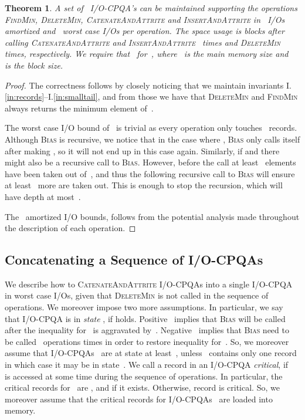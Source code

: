 \documentclass[]{article}
\newcommand{\iref}[1]{I.\ref{#1}}
\newtheorem{theorem}{Theorem}[section]
\begin{document}
\begin{theorem} \label{thm:iocpqa}
  A set of~ I/O-CPQA's can be maintained supporting the operations
  \textsc{FindMin}, \textsc{DeleteMin}, \textsc{CatenateAndAttrite} and
  \textsc{InsertAndAttrite} in~ I/Os amortized and~ worst
  case I/Os per operation. The space usage is  blocks
  after calling \textsc{CatenateAndAttrite} and \textsc{InsertAndAttrite}~
  times and \textsc{DeleteMin}~ times, respectively. We require that~ for~, where~ is the main memory size and~ is
  the block size.
\end{theorem}
\begin{proof}
  The correctness follows by closely noticing that we maintain invariants
  \iref{in:records}--\iref{in:smalltail}, and from those we have that
  \textsc{DeleteMin} and \textsc{FindMin} always returns the minimum
  element of~.

  The worst case I/O bound of~ is trivial as every operation only
  touches~ records. Although \textsc{Bias} is recursive, we notice
  that in the case where , \textsc{Bias} only calls itself after
  making , so it will not end up in this case again. Similarly, if
   and  there might also be a recursive call to
  \textsc{Bias}. However, before the call at least~ elements have been taken
  out of~, and thus the following recursive call to \textsc{Bias} will ensure
  at least~ more are taken out. This is enough to stop the recursion, which
  will have depth at most~.
 
  The~ amortized I/O bounds, follows from the potential analysis
  made throughout the description of each operation.
\end{proof}

\subsection{Concatenating a Sequence of I/O-CPQAs} \label{ssec:seq} 


We describe how to \textsc{CatenateAndAttrite} I/O-CPQAs
 into a single I/O-CPQA in  worst case
I/Os, given that \textsc{DeleteMin} is not called in the sequence of operations.
We moreover impose two more assumptions. In particular, we say that I/O-CPQA 
is in \textit{state} , if  holds.  Positive~ implies that \textsc{Bias} will be called
after the inequality for~ is aggravated by~. Negative~ implies that
\textsc{Bias} need to be called~ operations times in order to restore
inequality for~.  So, we moreover assume that I/O-CPQAs~
are at state at least~, unless~ contains only one record in which
case it may be in state~.  We call a record  in an I/O-CPQA 
\textit{critical}, if~ is accessed at some time during the sequence of
operations.  In particular, the critical records for~ are
,
and  if it exists. Otherwise, record
 is critical.  So, we moreover assume that the
critical records for I/O-CPQAs~ are loaded into memory.
\end{document}
